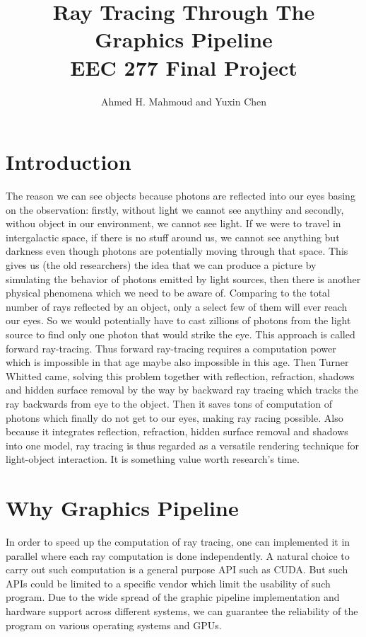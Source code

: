 \documentclass[a4paper,10pt]{article}
\title{Ray Tracing Through The Graphics Pipeline\\ 
 EEC 277 Final Project}
\author{Ahmed H. Mahmoud and Yuxin Chen}
\begin{document}
\maketitle

\section{Introduction}
The reason we can see objects because photons are reflected into our eyes basing on the observation: firstly, without light we cannot see anythiny and secondly, withou object in our environment, we cannot see light. If we were to travel in intergalactic space, if there is no stuff around us, we cannot see anything but darkness even though photons are potentially moving through that space. This gives us (the old researchers) the idea that we can produce a picture by simulating the behavior of photons emitted by light sources, then there is another physical phenomena which we need to be aware of. Comparing to the total number of rays reflected by an object, only a select few of them will ever reach our eyes. So we would potentially have to cast zillions of photons from the light source to find only one photon that would strike the eye. This approach is called forward ray-tracing. Thus forward ray-tracing requires a computation power which is impossible in that age maybe also impossible in this age. Then Turner Whitted \cite{whitted2005improved} came, solving this problem together with reflection, refraction, shadows and hidden surface removal by the way by backward ray tracing which tracks the ray backwards from eye to the object. Then it saves tons of computation of photons which finally do not get to our eyes, making ray racing possible. Also because it integrates reflection, refraction, hidden surface removal and shadows into one model, ray tracing is thus regarded as a versatile rendering technique for light-object interaction. It is something value worth research's time.
\section{Why Graphics Pipeline}
In order to speed up the computation of ray tracing, one can implemented it in parallel where each ray computation is done independently. A natural choice to carry out such computation is a general purpose API such as CUDA. But such APIs could be limited to a specific vendor which limit the usability of such program. Due to the wide spread of the graphic pipeline implementation and hardware support across different systems, we can guarantee the reliability of the program on various operating systems and GPUs. 
\end{document}
